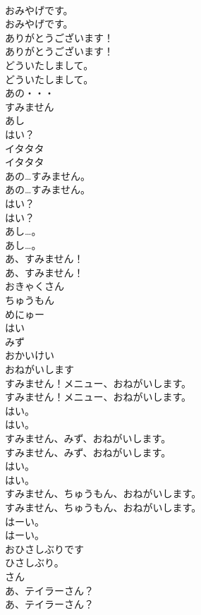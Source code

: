 \documentclass[8pt]{extreport}
\begin{document}
\begin{CJK}{UTF8}{min}
\\	おみやげです。	
\\	おみやげです。 
\\	ありがとうございます！	
\\	ありがとうございます！ 
\\	どういたしまして。	
\\	どういたしまして。 
\\	あの・・・
\\	すみません
\\	あし
\\	はい？
\\	イタタタ	
\\	イタタタ 
\\	あの…すみません。	
\\	あの…すみません。 
\\	はい？	
\\	はい？ 
\\	あし…。	
\\	あし…。 
\\	あ、すみません！	
\\	あ、すみません！ 
\\	おきゃくさん
\\	ちゅうもん
\\	めにゅー
\\	はい
\\	みず
\\	おかいけい
\\	おねがいします
\\	すみません！メニュー、おねがいします。	
\\	すみません！メニュー、おねがいします。 
\\	はい。	
\\	はい。 
\\	すみません、みず、おねがいします。	
\\	すみません、みず、おねがいします。 
\\	はい。	
\\	はい。 
\\	すみません、ちゅうもん、おねがいします。	
\\	すみません、ちゅうもん、おねがいします。 
\\	はーい。	
\\	はーい。 
\\	おひさしぶりです
\\	ひさしぶり。
\\	さん
\\	あ、テイラーさん？	
\\	あ、テイラーさん？ 

\end{CJK}
\end{document}
